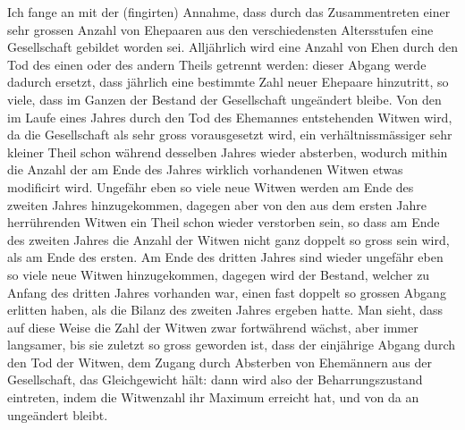 \documentclass[12pt,a4paper]{article}
\begin{document}
Ich fange an mit der (fingirten) Annahme, dass durch das Zusammentreten einer sehr grossen Anzahl von Ehepaaren aus den verschiedensten Altersstufen eine Gesellschaft gebildet worden sei. Allj\"ahrlich wird eine Anzahl von Ehen durch den Tod des einen oder des andern Theils getrennt werden: dieser Abgang werde dadurch ersetzt, dass j\"ahrlich eine bestimmte Zahl neuer Ehepaare hinzutritt, so viele, dass im Ganzen der Bestand der Gesellschaft unge\"andert bleibe. Von den im Laufe eines Jahres durch den Tod des Ehemannes entstehenden Witwen wird, da die Gesellschaft als sehr gross vorausgesetzt wird, ein verh\"altnissm\"assiger sehr kleiner Theil schon w\"ahrend desselben Jahres wieder absterben, wodurch mithin die Anzahl der am Ende des Jahres wirklich vorhandenen Witwen etwas modificirt wird. Ungef\"ahr eben so viele neue Witwen werden am Ende des zweiten Jahres hinzugekommen, dagegen aber von den aus dem ersten Jahre herr\"uhrenden Witwen ein Theil schon wieder verstorben sein, so dass am Ende des zweiten Jahres die Anzahl der Witwen nicht ganz doppelt so gross sein wird, als am Ende des ersten. Am Ende des dritten Jahres sind wieder ungef\"ahr eben so viele neue Witwen hinzugekommen, dagegen wird der Bestand, welcher zu Anfang des dritten Jahres vorhanden war, einen fast doppelt so grossen Abgang erlitten haben, als die Bilanz des zweiten Jahres ergeben hatte. Man sieht, dass auf diese Weise die Zahl der Witwen zwar fortw\"ahrend w\"achst, aber immer langsamer, bis sie zuletzt so gross geworden ist, dass der einj\"ahrige Abgang durch den Tod der Witwen, dem Zugang durch Absterben von Ehem\"annern aus der Gesellschaft, das Gleichgewicht h\"alt: dann wird also der Beharrungszustand eintreten, indem die Witwenzahl ihr Maximum erreicht hat, und von da an unge\"andert bleibt.
\end{document}
